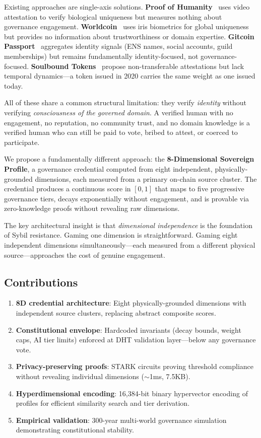 \documentclass[11pt,twocolumn]{article}
\begin{document}
Existing approaches are single-axis solutions. \textbf{Proof of Humanity}~\citep{poh2021} uses video attestation to verify biological uniqueness but measures nothing about governance engagement. \textbf{Worldcoin}~\citep{worldcoin2023} uses iris biometrics for global uniqueness but provides no information about trustworthiness or domain expertise. \textbf{Gitcoin Passport}~\citep{gitcoin2023} aggregates identity signals (ENS names, social accounts, guild memberships) but remains fundamentally identity-focused, not governance-focused. \textbf{Soulbound Tokens}~\citep{weyl2022} propose non-transferable attestations but lack temporal dynamics---a token issued in 2020 carries the same weight as one issued today.

All of these share a common structural limitation: they verify \emph{identity} without verifying \emph{consciousness of the governed domain}. A verified human with no engagement, no reputation, no community trust, and no domain knowledge is a verified human who can still be paid to vote, bribed to attest, or coerced to participate.

We propose a fundamentally different approach: the \textbf{8-Dimensional Sovereign Profile}, a governance credential computed from eight independent, physically-grounded dimensions, each measured from a primary on-chain source cluster. The credential produces a continuous score in $[0,1]$ that maps to five progressive governance tiers, decays exponentially without engagement, and is provable via zero-knowledge proofs without revealing raw dimensions.

The key architectural insight is that \emph{dimensional independence} is the foundation of Sybil resistance. Gaming one dimension is straightforward. Gaming eight independent dimensions simultaneously---each measured from a different physical source---approaches the cost of genuine engagement.

\subsection{Contributions}

\begin{enumerate}[nosep]
  \item \textbf{8D credential architecture}: Eight physically-grounded dimensions with independent source clusters, replacing abstract composite scores.
  \item \textbf{Constitutional envelope}: Hardcoded invariants (decay bounds, weight caps, AI tier limits) enforced at DHT validation layer---below any governance vote.
  \item \textbf{Privacy-preserving proofs}: STARK circuits proving threshold compliance without revealing individual dimensions ($\sim$1ms, 7.5KB).
  \item \textbf{Hyperdimensional encoding}: 16,384-bit binary hypervector encoding of profiles for efficient similarity search and tier derivation.
  \item \textbf{Empirical validation}: 300-year multi-world governance simulation demonstrating constitutional stability.
\end{enumerate}
\end{document}
